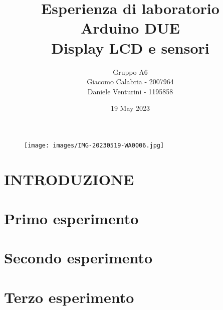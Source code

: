 \documentclass{article}
\title{Esperienza di laboratorio\\\textbf{Arduino DUE\\Display LCD e sensori}}
\author{Gruppo A6\\Giacomo Calabria - 2007964\\Daniele Venturini - 1195858}
\date{19 May 2023}
\begin{document}
    \begin{figure}
        \centering
        \texttt{[image: images/IMG-20230519-WA0006.jpg]}
    \end{figure}
    \maketitle
    \tableofcontents
    \clearpage
    
    \section*{INTRODUZIONE}
    
    \clearpage
    
    \section{Primo esperimento}
    
    \clearpage
    
    \section{Secondo esperimento}
    
    \clearpage
    
    \section{Terzo esperimento}
    
\end{document}
